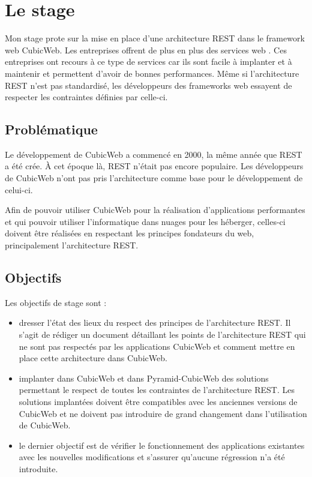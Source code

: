 \chapter{Le stage}
Mon stage prote sur la mise en place d'une architecture REST dans le framework web CubicWeb. Les entreprises offrent de plus en plus des services web . Ces entreprises ont recours à ce type de services car ils sont facile à implanter et à maintenir et permettent d'avoir de bonnes performances. Même si l'architecture REST n'est pas standardisé, les développeurs des frameworks web essayent de respecter les contraintes définies par celle-ci.   
\section{Problématique}
Le développement de CubicWeb a commencé en 2000, la même année que REST a été crée. \`A cet époque là, REST n'était pas encore populaire. Les développeurs de CubicWeb n'ont pas pris l'architecture comme base pour le développement de celui-ci.  

Afin de pouvoir utiliser CubicWeb pour la réalisation d'applications 	performantes et qui pouvoir utiliser l'informatique dans nuages pour les héberger, celles-ci doivent être réalisées en respectant les principes fondateurs du web, principalement l'architecture REST.


\section{Objectifs}
Les objectifs de stage sont :
\begin{itemize}
	\item dresser l'état des lieux du respect des principes de l'architecture REST. Il s'agit de rédiger un document détaillant les points de l'architecture REST qui ne sont pas respectés par les applications CubicWeb et comment mettre en place cette architecture dans CubicWeb.
	
	\item implanter dans CubicWeb et dans Pyramid-CubicWeb des solutions permettant le respect de toutes les contraintes de l'architecture REST.  Les solutions implantées doivent être compatibles avec les anciennes versions de CubicWeb et ne doivent pas introduire de grand changement dans l'utilisation de CubicWeb.
	
	\item le dernier objectif est de vérifier le fonctionnement des applications existantes avec les nouvelles modifications et s'assurer qu'aucune régression n'a été introduite. 
\end{itemize}